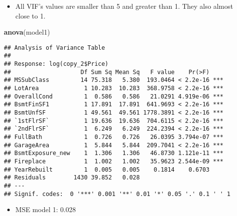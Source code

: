 \documentclass[]{article}
\newenvironment{Shaded}{\begin{snugshade}}{\end{snugshade}}
\newcommand{\CommentTok}[1]{\textcolor[rgb]{0.56,0.35,0.01}{\textit{#1}}}
\newcommand{\DataTypeTok}[1]{\textcolor[rgb]{0.13,0.29,0.53}{#1}}
\newcommand{\DecValTok}[1]{\textcolor[rgb]{0.00,0.00,0.81}{#1}}
\newcommand{\FloatTok}[1]{\textcolor[rgb]{0.00,0.00,0.81}{#1}}
\newcommand{\KeywordTok}[1]{\textcolor[rgb]{0.13,0.29,0.53}{\textbf{#1}}}
\newcommand{\NormalTok}[1]{#1}
\newcommand{\OperatorTok}[1]{\textcolor[rgb]{0.81,0.36,0.00}{\textbf{#1}}}
\newcommand{\OtherTok}[1]{\textcolor[rgb]{0.56,0.35,0.01}{#1}}
\newcommand{\StringTok}[1]{\textcolor[rgb]{0.31,0.60,0.02}{#1}}
\providecommand{\tightlist}{%
  \setlength{\itemsep}{0pt}\setlength{\parskip}{0pt}}
\begin{document}
\begin{itemize}
\tightlist
\item
  All VIF's values are smaller than 5 and greater than 1. They also
  almost close to 1.
\end{itemize}

\begin{Shaded}
\begin{Highlighting}[]
\KeywordTok{anova}\NormalTok{(model1)}
\end{Highlighting}
\end{Shaded}

\begin{verbatim}
## Analysis of Variance Table
## 
## Response: log(copy_2$Price)
##                    Df Sum Sq Mean Sq   F value    Pr(>F)    
## MSSubClass         14 75.318   5.380  193.0464 < 2.2e-16 ***
## LotArea             1 10.283  10.283  368.9758 < 2.2e-16 ***
## OverallCond         1  0.586   0.586   21.0291 4.919e-06 ***
## BsmtFinSF1          1 17.891  17.891  641.9693 < 2.2e-16 ***
## BsmtUnfSF           1 49.561  49.561 1778.3891 < 2.2e-16 ***
## `1stFlrSF`          1 19.636  19.636  704.6115 < 2.2e-16 ***
## `2ndFlrSF`          1  6.249   6.249  224.2394 < 2.2e-16 ***
## FullBath            1  0.726   0.726   26.0395 3.794e-07 ***
## GarageArea          1  5.844   5.844  209.7041 < 2.2e-16 ***
## BsmtExposure_new    1  1.306   1.306   46.8730 1.121e-11 ***
## Fireplace           1  1.002   1.002   35.9623 2.544e-09 ***
## YearRebuilt         1  0.005   0.005    0.1814    0.6703    
## Residuals        1430 39.852   0.028                        
## ---
## Signif. codes:  0 '***' 0.001 '**' 0.01 '*' 0.05 '.' 0.1 ' ' 1
\end{verbatim}

\begin{itemize}
\tightlist
\item
  MSE model 1: 0.028
\end{itemize}

\begin{Shaded}
\end{Shaded}
\end{document}
